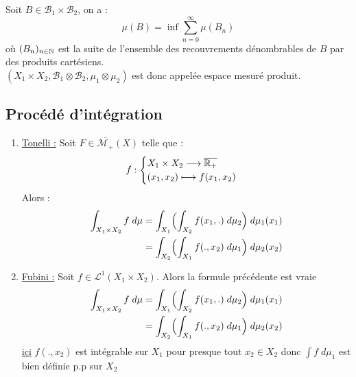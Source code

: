 \begin{definition}
    Soit $ B \in \mathcal{B}_1 \times \mathcal{B}_2$, on a :
        \[ \mu(B) = \inf \sum_{n=0}^{\infty} \mu (B_n) \] 
    où $(B_n)_{n \in \mathbb{N}}$ est la suite de l'ensemble des recouvrements dénombrables de $B$ par des produits cartésiens. \\
    $(X_1 \times X_2,\mathcal{B}_1 \otimes \mathcal{B}_2,\mu_1 \otimes \mu_2)$ est donc appelée espace mesuré produit. 
\end{definition}

\subsection{Procédé d'intégration}

\begin{theorem}
    \begin{enumerate}
        \item \underline{Tonelli :} Soit $F \in \overline{\mathcal{M}_+}(X)$ telle que :
            \[ f :
                \begin{cases}
                    X_1 \times X_2 \longrightarrow \overline{\mathbb{R}_+} \\ 
                    (x_1,x_2) \longmapsto f(x_1,x_2)
                \end{cases} \] 
            Alors :
                \begin{align*}
                    \int_{X_1 \times X_2} f \; d \mu    &= \int_{X_1} \Bigl( \int_{X_2} f(x_1,.) \; d \mu_2 \Bigr) \; d \mu_1(x_1) \\
                                                        &= \int_{X_2} \Bigl( \int_{X_1} f(.,x_2) \; d \mu_1 \Bigr) \; d \mu_2(x_2)
                \end{align*}
        \item \underline{Fubini :} Soit $f \in \mathcal{L}^1(X_1 \times X_2)$. Alors la formule précédente est vraie 
                \begin{align*}
                    \int_{X_1 \times X_2} f \; d \mu    &= \int_{X_1} \Bigl( \int_{X_2} f(x_1,.) \; d \mu_2 \Bigr) \; d \mu_1(x_1) \\
                                                        &= \int_{X_2} \Bigl( \int_{X_1} f(.,x_2) \; d \mu_1 \Bigr) \; d \mu_2(x_2)
                \end{align*}
                \underline{ici} $f(.,x_2)$ est intégrable sur $X_1$ pour presque tout $x_2 \in X_2$ donc $\int f \; d \mu_1$ est bien définie p.p sur $X_2$
    \end{enumerate}
\end{theorem}

